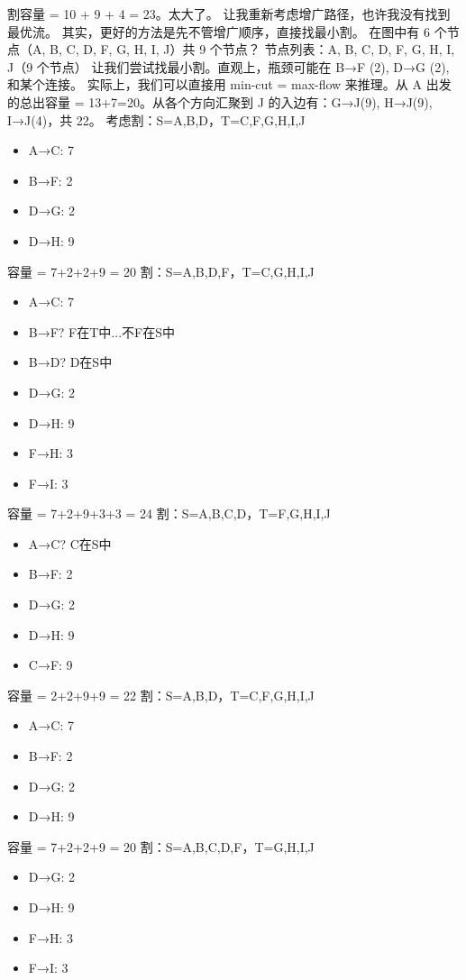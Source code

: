 \documentclass[10pt,a4paper,openany]{ctexbook}
\theoremstyle{definition}
\theoremstyle{remark}
\begin{document}
割容量 = 10 + 9 + 4 = 23。太大了。
让我重新考虑增广路径，也许我没有找到最优流。
其实，更好的方法是先不管增广顺序，直接找最小割。
在图中有 6 个节点（A, B, C, D, F, G, H, I, J）共 9 个节点？
节点列表：A, B, C, D, F, G, H, I, J（9 个节点）
让我们尝试找最小割。直观上，瓶颈可能在 B→F (2), D→G (2), 和某个连接。
实际上，我们可以直接用 min-cut = max-flow 来推理。从 A 出发的总出容量 = 13+7=20。从各个方向汇聚到 J 的入边有：G→J(9), H→J(9), I→J(4)，共 22。
考虑割：S={A,B,D}，T={C,F,G,H,I,J}
\begin{itemize}
\item A→C: 7
\item B→F: 2
\item D→G: 2
\item D→H: 9
\end{itemize}

容量 = 7+2+2+9 = 20
割：S={A,B,D,F}，T={C,G,H,I,J}
\begin{itemize}
\item A→C: 7
\item B→F? F在T中...不F在S中
\item B→D? D在S中
\item D→G: 2
\item D→H: 9
\item F→H: 3
\item F→I: 3
\end{itemize}

容量 = 7+2+9+3+3 = 24
割：S={A,B,C,D}，T={F,G,H,I,J}
\begin{itemize}
\item A→C? C在S中
\item B→F: 2
\item D→G: 2
\item D→H: 9
\item C→F: 9
\end{itemize}

容量 = 2+2+9+9 = 22
割：S={A,B,D}，T={C,F,G,H,I,J}
\begin{itemize}
\item A→C: 7
\item B→F: 2
\item D→G: 2
\item D→H: 9
\end{itemize}

容量 = 7+2+2+9 = 20
割：S={A,B,C,D,F}，T={G,H,I,J}
\begin{itemize}
\item D→G: 2
\item D→H: 9
\item F→H: 3
\item F→I: 3
\end{itemize}
\end{document}
